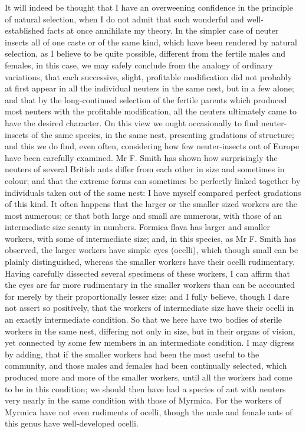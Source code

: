 \indent It will indeed be thought that I have an overweening confidence in the principle of natural selection, when I do not admit that such wonderful and well-established facts at once annihilate my theory. In the simpler case of neuter insects all of one caste or of the same kind, which have been rendered by natural selection, as I believe to be quite possible, different from the fertile males and females, in this case, we may safely conclude from the analogy of ordinary variations, that each successive, slight, profitable modification did not probably at first appear in all the individual neuters in the same nest, but in a few alone; and that by the long-continued selection of the fertile parents which produced most neuters with the profitable modification, all the neuters ultimately came to have the desired character. On this view we ought occasionally to find neuter-insects of the same species, in the same nest, presenting gradations of structure; and this we do find, even often, considering how few neuter-insects out of Europe have been carefully examined. Mr F. Smith has shown how surprisingly the neuters of several British ants differ from each other in size and sometimes in colour; and that the extreme forms can sometimes be perfectly linked together by individuals taken out of the same nest: I have myself compared perfect gradations of this kind. It often happens that the larger or the smaller sized workers are the most numerous; or that both large and small are numerous, with those of an intermediate size scanty in numbers. Formica flava has larger and smaller workers, with some of intermediate size; and, in this species, as Mr F. Smith has observed, the larger workers have simple eyes (ocelli), which though small can be plainly distinguished, whereas the smaller workers have their ocelli rudimentary. Having carefully dissected several specimens of these workers, I can affirm that the eyes are far more rudimentary in the smaller workers than can be accounted for merely by their proportionally lesser size; and I fully believe, though I dare not assert so positively, that the workers of intermediate size have their ocelli in an exactly intermediate condition. So that we here have two bodies of sterile workers in the same nest, differing not only in size, but in their organs of vision, yet connected by some few members in an intermediate condition. I may digress by adding, that if the smaller workers had been the most useful to the community, and those males and females had been continually selected, which produced more and more of the smaller workers, until all the workers had come to be in this condition; we should then have had a species of ant with neuters very nearly in the same condition with those of Myrmica. For the workers of Myrmica have not even rudiments of ocelli, though the male and female ants of this genus have well-developed ocelli.\\
